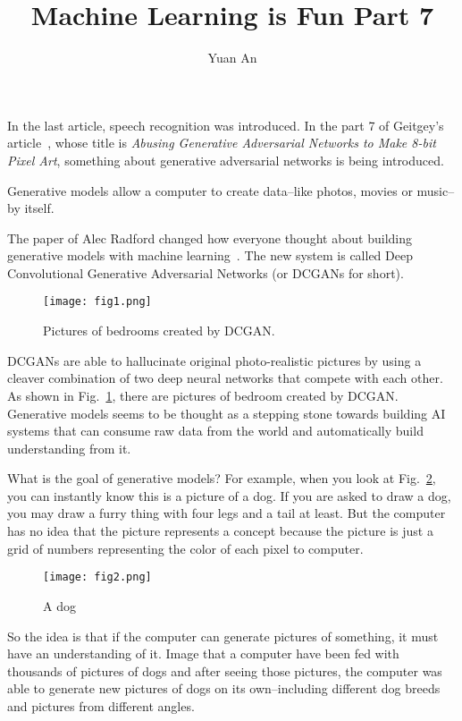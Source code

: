 \documentclass[10pt,twocolumn,letterpaper]{article}
\begin{document}
	\title{Machine Learning is Fun Part 7}	
	\author{Yuan An}
	\maketitle
	In the last article, speech recognition was introduced. In the part 7 of Geitgey's article~\cite{MLisFun}, whose title is \emph{Abusing Generative Adversarial Networks to Make 8-bit Pixel Art}, something about generative adversarial networks is being introduced.
	\par
	Generative models allow a computer to create data--like photos, movies or music--by itself.
	\par
	The paper of Alec Radford changed how everyone thought about building generative models with machine learning~\cite{DCGAN}. The new system is called Deep Convolutional Generative Adversarial Networks (or DCGANs for short). 
	\begin{figure}[h]
		\centering
		\texttt{[image: fig1.png]}
		\caption{Pictures of bedrooms created by DCGAN.} \label{fig1}
	\end{figure}
	\par
	DCGANs are able to hallucinate original photo-realistic pictures by using a cleaver combination of two deep neural networks that compete with each other. As shown in Fig.~\ref{fig1}, there are pictures of bedroom created by DCGAN. Generative models seems to be thought as a stepping stone towards building AI systems that can consume raw data from the world and automatically build understanding from it.
	\par
	What is the goal of generative models? For example, when you look at Fig.~\ref{dog}, you can instantly know this is a picture of a dog. If you are asked to draw a dog, you may draw a furry thing with four legs and a tail at least. But the computer has no idea  that the picture represents a concept because the picture is just a grid of numbers representing the color of each pixel to computer. 
	\begin{figure}[h]
		\centering
		\texttt{[image: fig2.png]}
		\caption{A dog} \label{dog}
	\end{figure}
	\par
	So the idea is that if the computer can generate pictures of something, it must have an understanding of it. Image that a computer have been fed with thousands of pictures of dogs and after seeing those pictures, the computer was able to generate new pictures of dogs on its own--including different dog breeds and pictures from different angles.
\end{document}
